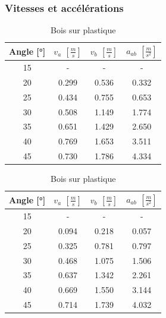 \documentclass[twoside,twocolumn]{article}
\begin{document}
\subsubsection*{Vitesses et accélérations}
\begin{table}[H]
\centering
\caption{Bois sur bois}
\begin{tabular}{|c|c|c|c|}
\hline
Angle [°] & $v_a$ $\left[ \frac{m}{s} \right]$ & $v_b$ $\left[ \frac{m}{s} \right]$ & $a_{ab}$ $\left[ \frac{m}{s^2} \right]$ \\
\hline \hline
15 & - & - & - \\
\hline
20 & 0.299 & 0.536 & 0.332 \\
\hline
25  & 0.434 & 0.755 & 0.653 \\
\hline
30 & 0.508 & 1.149 & 1.774 \\
\hline
35 & 0.651 & 1.429 & 2.650 \\
\hline
40 & 0.769 & 1.653 & 3.511 \\
\hline
45 & 0.730 & 1.786 & 4.334 \\
\hline
\end{tabular}
\label{table:v-abb}

\caption{Bois sur plastique}
\begin{tabular}{|c|c|c|c|}
\hline
Angle [°] &$v_a$ $\left[ \frac{m}{s} \right]$ & $v_b$ $\left[ \frac{m}{s} \right]$ & $a_{ab}$ $\left[ \frac{m}{s^2} \right]$ \\
           \hline \hline
15        &- & - & - \\
           \hline
20        &0.094 & 0.218 & 0.057 \\
           \hline
25        &0.325 & 0.781 & 0.797 \\
           \hline
30        &0.468 & 1.075 & 1.506 \\
           \hline
35        &0.637 & 1.342 & 2.261 \\
           \hline
40        &0.669 & 1.550 & 3.144 \\
           \hline
45        &0.714 & 1.739 & 4.032 \\
           \hline
\end{tabular}
\label{table:v-abp}
\end{table}
\end{document}
